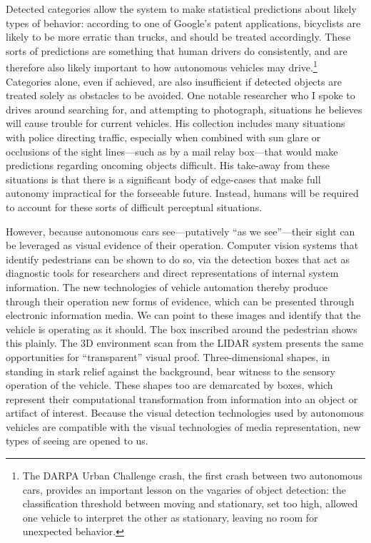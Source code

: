 Detected categories allow the system to make
statistical predictions about likely types of behavior: according to
one of Google's patent applications, bicyclists are likely to be more
erratic than trucks, and should be treated
accordingly.\cite{predictPatent} These sorts of predictions are
something that human drivers do consistently, and are therefore also
likely important to how autonomous vehicles may drive.\footnote{The
  DARPA Urban Challenge crash, the first crash between two autonomous
  cars, provides an important lesson on the vagaries of object
  detection: the classification threshold between moving and
  stationary, set too high, allowed one vehicle to interpret the other
  as stationary, leaving no room for unexpected behavior.\cite{???}}
Categories alone, even if achieved, are also insufficient if detected
objects are treated solely as obstacles to be avoided. One notable
researcher who I spoke to drives around searching 
for, and attempting to photograph, situations he believes will cause
trouble for current vehicles. His collection includes many situations with police
directing traffic, especially when combined with sun glare or
occlusions of the sight lines---such as by a mail relay box---that
would make predictions regarding oncoming 
objects difficult. His take-away from these situations is that there
is a significant body of edge-cases that make full autonomy
impractical for the forseeable future. Instead, humans will be
required to account for these sorts of difficult perceptual situations. 


However, because autonomous cars see---putatively ``as we see''---their sight can
be leveraged as visual evidence of their operation. Computer vision systems that identify
pedestrians can be shown to do so, via the detection boxes that act as
diagnostic tools for researchers and direct representations of
internal system information. The new technologies of vehicle
automation thereby produce through 
their operation new forms of evidence, which can be presented through
electronic information media. We can point to these images and identify
that the vehicle is operating as it should. The box inscribed around
the pedestrian shows this plainly. The 3D environment scan from the
LIDAR system presents the same opportunities for ``transparent'' visual
proof. Three-dimensional shapes, in standing in stark relief against
the background, bear witness to the sensory operation of the vehicle.
These shapes too are demarcated by boxes, which represent their
computational transformation from information into an object or
artifact of interest. Because the visual detection technologies used
by autonomous vehicles are compatible with the visual technologies of
media representation, new types of seeing are opened to us.

